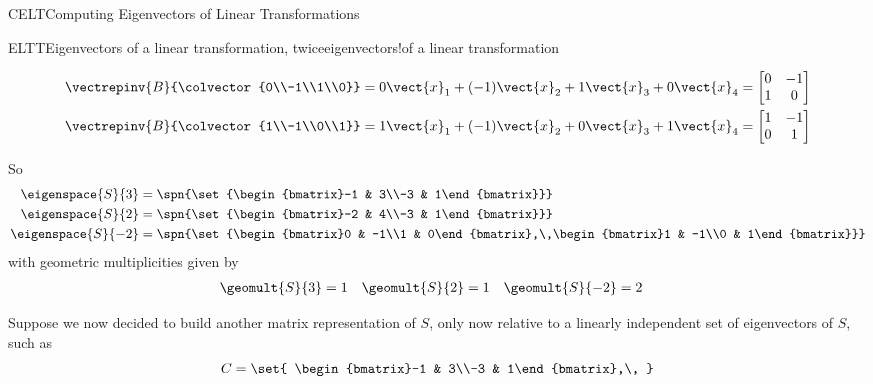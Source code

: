 \begin{subsect}{CELT}{Computing Eigenvectors of Linear Transformations}
\begin{example}{ELTT}{Eigenvectors of a linear transformation, twice}{eigenvectors!of a linear transformation}
\begin{para}
\begin{align*}
%
\vectrepinv{B}{\colvector{0\\-1\\1\\0}}
&=
0\vect{x}_1+(-1)\vect{x}_2+1\vect{x}_3+0\vect{x}_4=
\begin{bmatrix}0 & -1\\1 & 0\end{bmatrix}\\
%
\vectrepinv{B}{\colvector{1\\-1\\0\\1}}
&=
1\vect{x}_1+(-1)\vect{x}_2+0\vect{x}_3+1\vect{x}_4=
\begin{bmatrix}1 & -1\\0 & 1\end{bmatrix}\\
%
\end{align*}
\end{para}
%
\begin{para}So
%
\begin{align*}
\eigenspace{S}{3}&=
\spn{\set{\begin{bmatrix}-1 & 3\\-3 & 1\end{bmatrix}}}\\
%
\eigenspace{S}{2}&=
\spn{\set{\begin{bmatrix}-2 & 4\\-3 & 1\end{bmatrix}}}\\
%
\eigenspace{S}{-2}&=
\spn{\set{\begin{bmatrix}0 & -1\\1 & 0\end{bmatrix},\,\begin{bmatrix}1 & -1\\0 & 1\end{bmatrix}}}
\end{align*}
%
with geometric multiplicities given by
%
%
\begin{align*}
\geomult{S}{3}&=1
&
\geomult{S}{2}&=1
&
\geomult{S}{-2}&=2
\end{align*}
\end{para}
%
\begin{para}Suppose we now decided to build another matrix representation of $S$, only now relative to a linearly independent set of eigenvectors of $S$, such as
%
\begin{equation*}
C=
\set{
\begin{bmatrix}-1 & 3\\-3 & 1\end{bmatrix},\,
}
\end{equation*}
\end{para}
\end{example}
\end{subsect}
